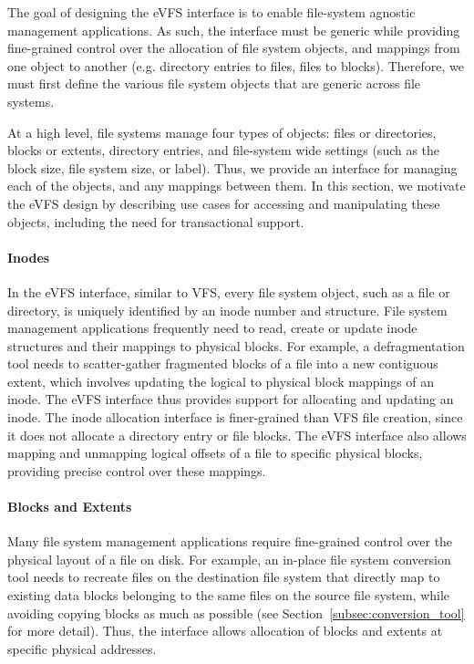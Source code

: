 The goal of designing the eVFS interface is to enable file-system agnostic management applications. As such, the interface must be generic while providing fine-grained control over the allocation of file system objects, and mappings from one object to another (e.g. directory entries to files, files to blocks). Therefore, we must first define the various file system objects that are generic across file systems.

At a high level, file systems manage four types of objects: files or directories, blocks or extents, directory entries, and file-system wide settings (such as the block size, file system size, or label). Thus, we provide an interface for managing each of the objects, and any mappings between them. In this section, we motivate the eVFS design by describing use cases for accessing and manipulating these objects, including the need for transactional support.

\paragraph{Inodes} In the eVFS interface, similar to VFS, every file system object, such as a file or directory, is uniquely identified by an inode number and structure. File system management applications frequently need to read, create or update inode structures and their mappings to physical blocks.
For example, a defragmentation tool needs to scatter-gather fragmented blocks of a file into a new contiguous extent, which involves updating the logical to physical block mappings of an inode. The eVFS interface thus provides support for allocating and updating an inode. The inode allocation interface is finer-grained than VFS file creation, since it does not allocate a directory entry or file blocks. The eVFS interface also allows mapping and unmapping logical offsets of a file to specific physical blocks, providing precise control over these mappings.

\paragraph{Blocks and Extents} Many file system management applications require fine-grained control over the physical layout of a file on disk. For example, an in-place file system conversion tool needs to recreate files on the destination file system that directly map to existing data blocks belonging to the same files on the source file system, while avoiding copying blocks as much as possible (see Section~\ref{subsec:conversion_tool} for more detail). Thus, the interface allows allocation of blocks and extents at specific physical addresses.

